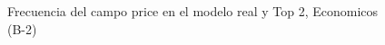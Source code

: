 \begin{figure}[H]
    \centering
    
    \caption{Frecuencia del campo  price en el modelo real y Top 2, Economicos (B-2)}
    \label{frecuency- Price-top2}
\end{figure}